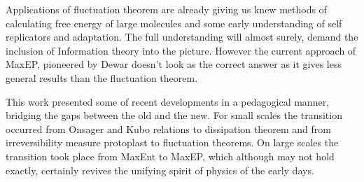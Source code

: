 \documentclass[a4paper,12pt]{article}
\begin{document}
Applications of fluctuation theorem are already giving us knew methods of calculating free energy of large molecules and some early understanding of self replicators and adaptation. The full understanding will almost surely, demand the inclusion of Information theory into the picture. However the current approach of MaxEP, pioneered by Dewar doesn't look as the correct answer as it gives less general results than the fluctuation theorem.  

This work presented some of recent developments in a pedagogical manner, bridging the gaps between the old and the new. For small scales the transition occurred from Onsager and Kubo relations to dissipation theorem and from irreversibility measure protoplast to fluctuation theorems.
On large scales the transition took place from MaxEnt to MaxEP, which although may not hold exactly, certainly revives the unifying spirit of physics of the early days.    

\newpage



\end{document}
